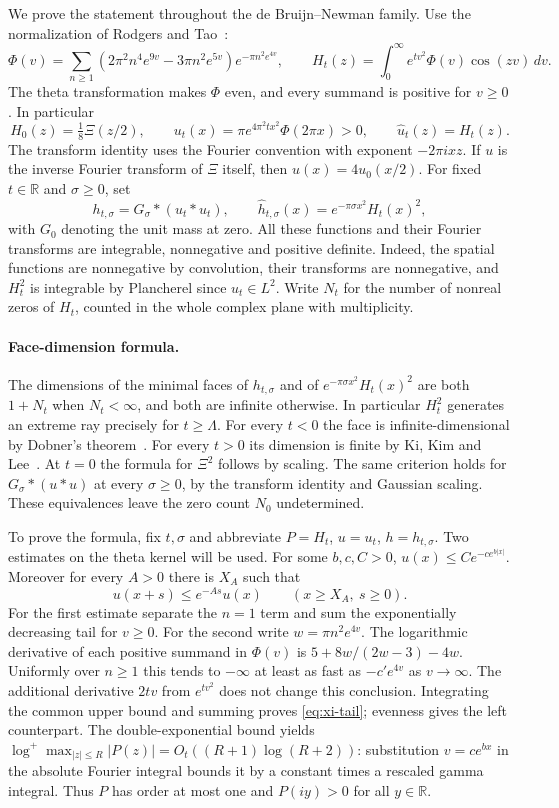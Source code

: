 \documentclass[11pt,a4paper]{article}
\numberwithin{equation}{section}
\begin{document}
We prove the statement throughout the de Bruijn--Newman family. Use
the normalization of Rodgers and Tao~\cite{RTNewman}:
\[
 \Phi(v)=\sum_{n\ge1}
  (2\pi^2n^4e^{9v}-3\pi n^2e^{5v})e^{-\pi n^2e^{4v}},\qquad
 H_t(z)=\int_0^\infty e^{tv^2}\Phi(v)\cos(zv)\,dv.
\]
The theta transformation makes $\Phi$ even, and every summand is positive
for $v\ge0$. In particular
\[
 H_0(z)=\tfrac18\Xi(z/2),\qquad
 u_t(x)=\pi e^{4\pi^2tx^2}\Phi(2\pi x)>0,\qquad
 \widehat u_t(z)=H_t(z).
\]
The transform identity uses the Fourier convention with exponent
$-2\pi i xz$. If $u$ is the inverse Fourier transform of $\Xi$ itself,
then $u(x)=4u_0(x/2)$. For fixed $t\in\mathbb R$ and $\sigma\ge0$, set
\[
 h_{t,\sigma}=G_\sigma*(u_t*u_t),\qquad
 \widehat h_{t,\sigma}(x)=e^{-\pi\sigma x^2}H_t(x)^2,
\]
with $G_0$ denoting the unit mass at zero. All these functions and their Fourier transforms are integrable, nonnegative and positive definite.
Indeed, the spatial functions are nonnegative by convolution, their
transforms are nonnegative, and $H_t^2$ is integrable by Plancherel
since $u_t\in L^2$. Write $N_t$ for the number of nonreal zeros of
$H_t$, counted in the whole complex plane with multiplicity.

\paragraph{Face-dimension formula.}
The dimensions of the minimal faces of $h_{t,\sigma}$ and of
$e^{-\pi\sigma x^2}H_t(x)^2$ are both $1+N_t$ when $N_t<\infty$,
and both are infinite otherwise. In particular $H_t^2$ generates an
extreme ray precisely for $t\ge\Lambda$. For every $t<0$ the face is
infinite-dimensional by Dobner's theorem~\cite{DobnerNewman}.
For every $t>0$ its dimension is finite by Ki, Kim and
Lee~\cite{KKLNewman}. At $t=0$ the formula for $\Xi^2$ follows by
scaling. The same criterion holds for $G_\sigma*(u*u)$ at every
$\sigma\ge0$, by the transform identity and Gaussian scaling.
These equivalences leave the zero count $N_0$ undetermined.

To prove the formula, fix $t,\sigma$ and abbreviate $P=H_t$, $u=u_t$,
$h=h_{t,\sigma}$. Two estimates on the theta kernel will be used.
For some $b,c,C>0$, $u(x)\le C e^{-c e^{b|x|}}$. Moreover for
every $A>0$ there is $X_A$ such that
\begin{equation}
 u(x+s)\le e^{-As}u(x)\qquad (x\ge X_A,\ s\ge0).
 \label{eq:xi-tail}
\end{equation}
For the first estimate separate the $n=1$ term and sum the exponentially
decreasing tail for $v\ge0$. For the second write
$w=\pi n^2 e^{4v}$. The logarithmic derivative of each positive
summand in $\Phi(v)$ is $5+8w/(2w-3)-4w$. Uniformly over $n\ge1$
this tends to $-\infty$ at least as fast as $-c'e^{4v}$ as
$v\to\infty$. The additional derivative $2tv$ from $e^{tv^2}$
does not change this conclusion. Integrating the common upper bound
and summing proves \eqref{eq:xi-tail}; evenness gives the left counterpart.
The double-exponential bound yields
$\log^+\max_{|z|\le R}|P(z)|=O_t((R+1)\log(R+2))$: substitution
$v=c e^{b x}$ in the absolute Fourier integral bounds it by a constant
times a rescaled gamma integral. Thus $P$ has order at most one and
$P(iy)>0$ for all $y\in\mathbb R$.
\end{document}
